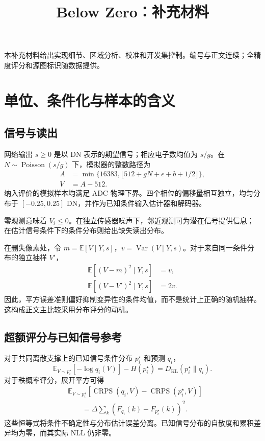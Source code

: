 \documentclass[10pt,twocolumn,journal]{IEEEtran}
\DeclareMathOperator{\CRPS}{CRPS}
\newcommand{\E}{\mathbb E}
\begin{document}
\title{Below Zero：补充材料}
\author{\BZAuthorBlockZH}
\maketitle
\thispagestyle{fancy}

本补充材料给出实现细节、区域分析、校准和开发集控制。编号与正文连续；全精度评分和源图标识随数据提供。

\section{单位、条件化与样本的含义}
\subsection{信号与读出}
网络输出 $s\geq0$ 是以 DN 表示的期望信号；相应电子数均值为 $s/g$。在 $N\sim\operatorname{Poisson}(s/g)$ 下，模拟器的整数路径为
\begin{equation}
\begin{aligned}
A&=\min\{16383,\lfloor512+gN+\epsilon+b+1/2\rfloor\},\\
V&=A-512.
\end{aligned}
\end{equation}
纳入评价的模拟样本均满足 ADC 物理下界。四个相位的偏移量相互独立，均匀分布于 $[-0.25,0.25]$ DN，并作为已知条件输入估计器和解码器。

零观测意味着 $V_i\leq0$。在独立传感器噪声下，邻近观测可为潜在信号提供信息；在估计信号条件下的条件分布则给出缺失读出分布。

在删失像素处，令 $m=\E[V\mid Y,s]$，$v=\operatorname{Var}(V\mid Y,s)$。对于来自同一条件分布的独立抽样 $V'$，
\begin{align}
\E[(V-m)^2\mid Y,s]&=v,\\
\E[(V-V')^2\mid Y,s]&=2v.
\end{align}
因此，平方误差准则偏好抑制变异性的条件均值，而不是统计上正确的随机抽样。这构成正文主比较采用分布评分的动机。

\subsection{超额评分与已知信号参考}
对于共同离散支撑上的已知信号条件分布 $p_i^\star$ 和预测 $q_i$，
\begin{equation}
\E_{V\sim p_i^\star}[-\log q_i(V)]-H(p_i^\star)=D_{\mathrm{KL}}(p_i^\star\|q_i).
\end{equation}
对于秩概率评分，展开平方可得
\begin{equation}
\begin{split}
&\E_{V\sim p_i^\star}[\CRPS(q_i,V)-\CRPS(p_i^\star,V)]\\
&\qquad=\Delta\sum_k\left(F_{q_i}(k)-F_{p_i^\star}(k)\right)^2.
\end{split}
\end{equation}
这些恒等式将条件不确定性与分布估计误差分离。已知信号分布的自散度和累积差异均为零，而其实际 NLL 仍非零。
\end{document}
